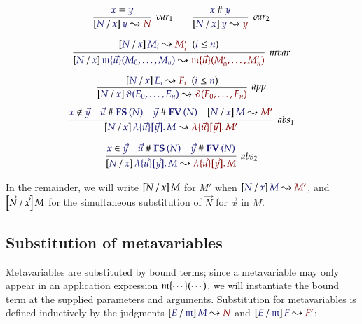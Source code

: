 \documentclass[11pt]{article}
\theoremstyle{definition}
\theoremstyle{remark}
\numberwithin{equation}{section}
\begin{document}
\begin{gather*}
  \infer[\textit{var}_1]{
    \IsSubst{N}{x}{y}{N}
  }{
    \IsEq{x}{y}
  }
\qquad
  \infer[\textit{var}_2]{
    \IsSubst{N}{x}{y}{y}
  }{
    \IsApart{x}{y}
  }
\\[6pt]
  \infer[\textit{mvar}]{
    \IsSubst{N}{x}{
      \MApp{\MV{m}}{\vec{u}}{M_0,\dots,M_n}
    }{
      \MApp{\MV{m}}{\vec{u}}{M'_0,\dots,M'_n}
    }
  }{
    \HypJ{
      \IsSubst{N}{x}{M_i}{M'_i}
    }{
      \Leq{i}{n}
    }
  }
\\[6pt]
  \infer[\textit{app}]{
    \IsSubst{N}{x}{
      \App{\vartheta}{E_0,\dots,E_n}
    }{
      \App{\vartheta}{F_0,\dots,F_n}
    }
  }{
    \HypJ{
      \IsSubst{N}{x}{E_i}{F_i}
    }{
      \Leq{i}{n}
    }
  }
\end{gather*}
\begin{gather*}
  \infer[\textit{abs}_1]{
    \IsSubst{N}{x}{
      \MkBTm{\vec{u}}{\vec{y}}{M}
    }{
      \MkBTm{\vec{u}}{\vec{y}}{M'}
    }
  }{
    \NotIn{x}{\vec{y}}
&
    \IsApart{\vec{u}}{\FS{N}}
&
    \IsApart{\vec{y}}{\FV{N}}
&
    \IsSubst{N}{x}{M}{M'}
  }
\\[6pt]
  \infer[\textit{abs}_2]{
    \IsSubst{N}{x}{
      \MkBTm{\vec{u}}{\vec{y}}{M}
    }{
      \MkBTm{\vec{u}}{\vec{y}}{M}
    }
  }{
    \Member{x}{\vec{y}}
&
    \IsApart{\vec{u}}{\FS{N}}
&
    \IsApart{\vec{y}}{\FV{N}}
  }
\end{gather*}

In the remainder, we will write $\left[N\, /\, x\right]M$ for $M'$ when
$\IsSubst{N}{x}{M}{M'}$, and $\left[\vec{N}\, /\, \vec{x}\right]M$ for the simultaneous
substitution of $\vec{N}$ for $\vec{x}$ in $M$.

\subsection{Substitution of metavariables}

Metavariables are substituted by bound terms; since a metavariable may only
appear in an application expression $\mathfrak{m}\{\cdots\}(\cdots)$, we will
instantiate the bound term at the supplied parameters and arguments.
Substitution for metavariables is defined inductively by the judgments
$\IsSubst{E}{\MV{m}}{M}{N}$ and $\IsSubst{E}{\MV{m}}{F}{F'}$:
\end{document}
